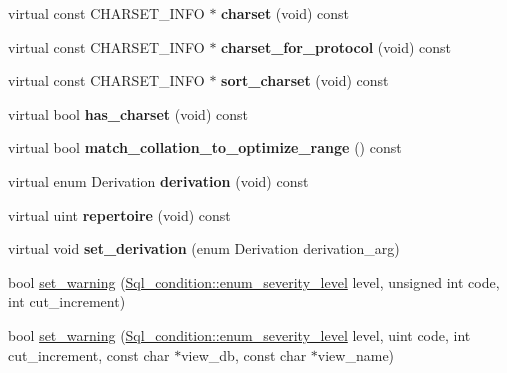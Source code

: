 \begin{DoxyCompactItemize}
\item 
\mbox{\label{classField_a7df94fe10413b4746e3260d66b92999f}} 
virtual const C\+H\+A\+R\+S\+E\+T\+\_\+\+I\+N\+FO $\ast$ {\bfseries charset} (void) const
\item 
\mbox{\label{classField_a367af8c355ed087fb5b25c13820fcf5f}} 
virtual const C\+H\+A\+R\+S\+E\+T\+\_\+\+I\+N\+FO $\ast$ {\bfseries charset\+\_\+for\+\_\+protocol} (void) const
\item 
\mbox{\label{classField_a337468e9265ac8a37f0d8b2b6096b14b}} 
virtual const C\+H\+A\+R\+S\+E\+T\+\_\+\+I\+N\+FO $\ast$ {\bfseries sort\+\_\+charset} (void) const
\item 
\mbox{\label{classField_add1cd2216b17dfe4dac406e8e4531e71}} 
virtual bool {\bfseries has\+\_\+charset} (void) const
\item 
\mbox{\label{classField_aeb114242d1e4c1e29e44225df0e93ac1}} 
virtual bool {\bfseries match\+\_\+collation\+\_\+to\+\_\+optimize\+\_\+range} () const
\item 
\mbox{\label{classField_abb549cdb08296cb57b091920c1ed6769}} 
virtual enum Derivation {\bfseries derivation} (void) const
\item 
\mbox{\label{classField_a9b686bbeeb9d6e80300fcfc50dd75778}} 
virtual uint {\bfseries repertoire} (void) const
\item 
\mbox{\label{classField_a65c516b879456772e038d5b478a33bb2}} 
virtual void {\bfseries set\+\_\+derivation} (enum Derivation derivation\+\_\+arg)
\item 
bool \mbox{\hyperlink{classField_a9160a32737f88984fe56ab6488133a31}{set\+\_\+warning}} (\mbox{\hyperlink{classSql__condition_ab0602581e19cddb609bfe10c44be4e83}{Sql\+\_\+condition\+::enum\+\_\+severity\+\_\+level}} level, unsigned int code, int cut\+\_\+increment)
\item 
bool \mbox{\hyperlink{classField_a29c5578802debf1372f839d675517866}{set\+\_\+warning}} (\mbox{\hyperlink{classSql__condition_ab0602581e19cddb609bfe10c44be4e83}{Sql\+\_\+condition\+::enum\+\_\+severity\+\_\+level}} level, uint code, int cut\+\_\+increment, const char $\ast$view\+\_\+db, const char $\ast$view\+\_\+name)

\end{DoxyCompactItemize}
